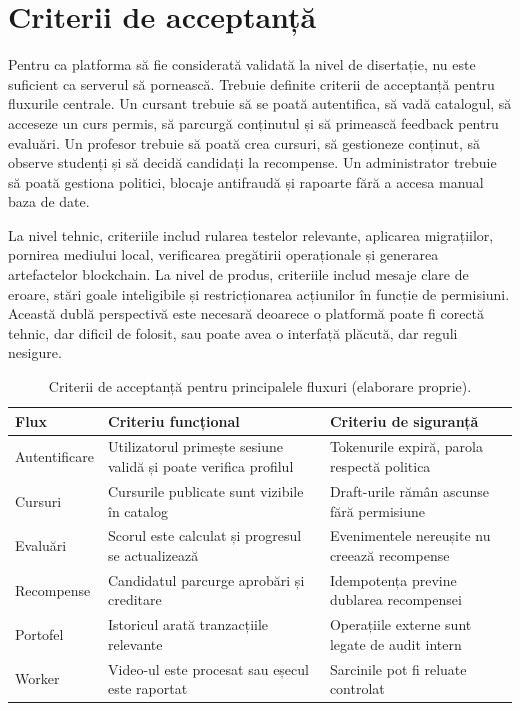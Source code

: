 \section{Criterii de acceptanță}
Pentru ca platforma să fie considerată validată la nivel de disertație, nu este suficient ca serverul să pornească. Trebuie definite criterii de acceptanță pentru fluxurile centrale. Un cursant trebuie să se poată autentifica, să vadă catalogul, să acceseze un curs permis, să parcurgă conținutul și să primească feedback pentru evaluări. Un profesor trebuie să poată crea cursuri, să gestioneze conținut, să observe studenți și să decidă candidați la recompense. Un administrator trebuie să poată gestiona politici, blocaje antifraudă și rapoarte fără a accesa manual baza de date.

La nivel tehnic, criteriile includ rularea testelor relevante, aplicarea migrațiilor, pornirea mediului local, verificarea pregătirii operaționale și generarea artefactelor blockchain. La nivel de produs, criteriile includ mesaje clare de eroare, stări goale inteligibile și restricționarea acțiunilor în funcție de permisiuni. Această dublă perspectivă este necesară deoarece o platformă poate fi corectă tehnic, dar dificil de folosit, sau poate avea o interfață plăcută, dar reguli nesigure.

\begin{table}[H]
    \centering
    \caption{Criterii de acceptanță pentru principalele fluxuri (elaborare proprie).}
    \label{tab:criterii_acceptanta}
    \begin{tabular}{P{3.4cm}P{5.1cm}P{5.1cm}}
        \toprule
        Flux & Criteriu funcțional & Criteriu de siguranță \\
        \midrule
        Autentificare & Utilizatorul primește sesiune validă și poate verifica profilul & Tokenurile expiră, parola respectă politica \\
        Cursuri & Cursurile publicate sunt vizibile în catalog & Draft-urile rămân ascunse fără permisiune \\
        Evaluări & Scorul este calculat și progresul se actualizează & Evenimentele nereușite nu creează recompense \\
        Recompense & Candidatul parcurge aprobări și creditare & Idempotența previne dublarea recompensei \\
        Portofel & Istoricul arată tranzacțiile relevante & Operațiile externe sunt legate de audit intern \\
        Worker & Video-ul este procesat sau eșecul este raportat & Sarcinile pot fi reluate controlat \\
        \bottomrule
    \end{tabular}
\end{table}


